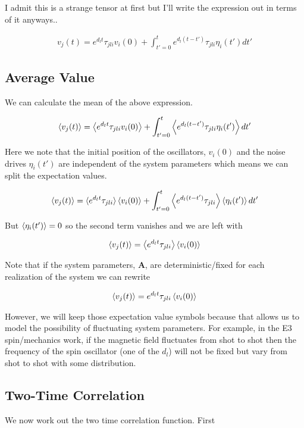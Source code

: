 \documentclass[12pt]{article}
\newcommand{\bv}[1]{\boldsymbol{#1}}
\begin{document}
I admit this is a strange tensor at first but I'll write the expression out in terms of it anyways..

\begin{align}
v_j(t) = e^{d_l t} \tau_{jli} v_i(0) + \int_{t'=0}^t e^{d_l(t-t')} \tau_{jli}\eta_i(t') dt'
\end{align}

\subsection{Average Value}
We can calculate the mean of the above expression.

\begin{align}
\Braket{v_j(t)} = \Braket{e^{d_l t}\tau_{jli} v_i(0)} + \int_{t'=0}^{t}\Braket{e^{d_l(t-t')}\tau_{jli} \eta_i(t')}dt'
\end{align}

Here we note that the initial position of the oscillators, $v_i(0)$ and the noise drives $\eta_i(t')$ are independent of the system parameters which means we can split the expectation values.

\begin{align}
\braket{v_j(t)} = \braket{e^{d_l t}\tau_{jli}}\Braket{v_i(0)} + \int_{t'=0}^t \Braket{e^{d_l (t-t')}\tau_{jli}}\Braket{\eta_i(t')}dt'
\end{align}

But $\Braket{\eta_i(t')} = 0$ so the second term vanishes and we are left with

\begin{align}
\braket{v_j(t)} = \Braket{e^{d_l t}\tau_{jli}}\Braket{v_i(0)}
\end{align}

Note that if the system parameters, $\bv{A}$, are deterministic/fixed for each realization of the system we can rewrite

\begin{align}
\braket{v_j(t)} = e^{d_l t} \tau_{jli} \Braket{v_i(0)}
\end{align}

However, we will keep those expectation value symbols because that allows us to model the possibility of fluctuating system parameters. For example, in the E3 spin/mechanics work, if the magnetic field fluctuates from shot to shot then the frequency of the spin oscillator (one of the $d_l$) will not be fixed but vary from shot to shot with some distribution.

\subsection{Two-Time Correlation}
We now work out the two time correlation function. First
\end{document}
